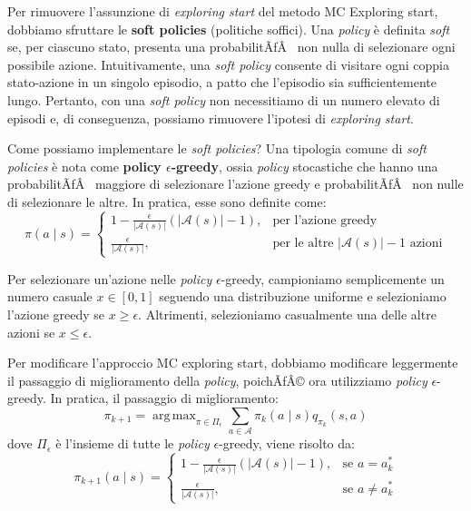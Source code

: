 ﻿\documentclass[11pt, a4paper]{report}
\DeclareMathOperator*{\argmax}{arg\,max}
\begin{document}
Per rimuovere l'assunzione di \emph{exploring start} del metodo MC Exploring start, dobbiamo sfruttare le \textbf{soft policies} (politiche soffici). Una \emph{policy} è definita \emph{soft} se, per ciascuno stato, presenta una probabilitÃƒÂ  non nulla di selezionare ogni possibile azione. Intuitivamente, una \emph{soft policy} consente di visitare ogni coppia stato-azione in un singolo episodio, a patto che l'episodio sia sufficientemente lungo. Pertanto, con una \emph{soft policy} non necessitiamo di un numero elevato di episodi e, di conseguenza, possiamo rimuovere l'ipotesi di \emph{exploring start}.

Come possiamo implementare le \emph{soft policies}? Una tipologia comune di \emph{soft policies} è nota come \textbf{policy $\epsilon$-greedy}, ossia \emph{policy} stocastiche che hanno una probabilitÃƒÂ  maggiore di selezionare l'azione greedy e probabilitÃƒÂ  non nulle di selezionare le altre. In pratica, esse sono definite come:
\begin{equation}
\pi(a \mid s) = \begin{cases} 1 - \frac{\epsilon}{|\mathcal{A}(s)|}(|\mathcal{A}(s)| - 1), & \text{per l'azione greedy} \\ \frac{\epsilon}{|\mathcal{A}(s)|}, & \text{per le altre } |\mathcal{A}(s)| - 1 \text{ azioni} \end{cases}
\end{equation}

Per selezionare un'azione nelle \emph{policy} $\epsilon$-greedy, campioniamo semplicemente un numero casuale $x \in [0, 1]$ seguendo una distribuzione uniforme e selezioniamo l'azione greedy se $x \ge \epsilon$. Altrimenti, selezioniamo casualmente una delle altre azioni se $x \le \epsilon$.

Per modificare l'approccio MC exploring start, dobbiamo modificare leggermente il passaggio di miglioramento della \emph{policy}, poichÃƒÂ© ora utilizziamo \emph{policy} $\epsilon$-greedy. In pratica, il passaggio di miglioramento:
\begin{equation}
\pi_{k+1} = \argmax_{\pi \in \Pi_\epsilon} \sum_{a \in \mathcal{A}} \pi_k(a \mid s) q_{\pi_k}(s, a)
\end{equation}
dove $\Pi_\epsilon$ è l'insieme di tutte le \emph{policy} $\epsilon$-greedy, viene risolto da:
\begin{equation}
\pi_{k+1}(a \mid s) = \begin{cases} 1 - \frac{\epsilon}{|\mathcal{A}(s)|}(|\mathcal{A}(s)| - 1), & \text{se } a = a^*_k \\ \frac{\epsilon}{|\mathcal{A}(s)|}, & \text{se } a \ne a^*_k \end{cases}
\end{equation}
\end{document}
